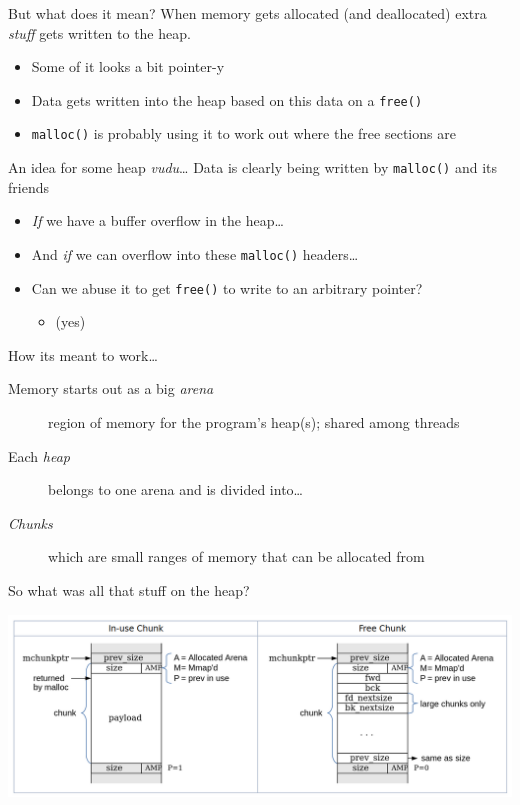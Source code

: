 \documentclass[9pt,aspectratio=169]{beamer}
\begin{document}
\begin{frame}[label={sec:org84c4799},fragile]{But what does it mean?}
 When memory gets allocated (and deallocated) extra \emph{stuff} gets written to the heap.
\begin{itemize}
\item Some of it looks a bit pointer-y
\item Data gets written into the heap based on this data on a \texttt{free()}
\item \texttt{malloc()} is probably using it to work out where the free sections are
\end{itemize}
\end{frame}
\begin{frame}[label={sec:org31c472f},fragile]{An idea for some heap \emph{vudu}\ldots{}}
 Data is clearly being written by \texttt{malloc()} and its friends
\begin{itemize}
\item \emph{If} we have a buffer overflow in the heap\ldots{}
\item And \emph{if} we can overflow into these \texttt{malloc()} headers\ldots{}
\item Can we abuse it to get \texttt{free()} to write to an arbitrary pointer?
\begin{itemize}
\item (yes)
\end{itemize}
\end{itemize}
\end{frame}
\begin{frame}[label={sec:org0aa227b}]{How its meant to work\ldots{}}
\begin{description}
\item[{Memory starts out as a big \emph{arena}}] region of memory for the program's heap(s); shared among threads
\item[{Each \emph{heap}}] belongs to one arena and is divided into\ldots{}
\item[{\emph{Chunks}}] which are small ranges of memory that can be allocated from
\end{description}
\end{frame}
\begin{frame}[label={sec:org8a96934}]{So what was all that stuff on the heap?}
\begin{center}
\includegraphics[width=\linewidth]{./chunks.png}
\end{center}
\end{frame}
\end{document}
